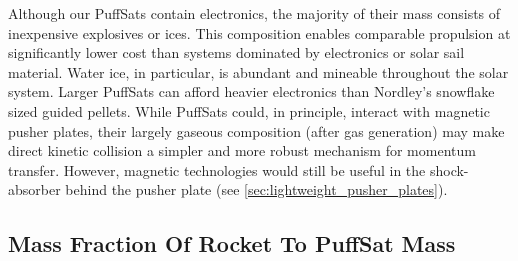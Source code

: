 \documentclass{article}
\begin{document}
Although our PuffSats contain electronics, the majority of their mass consists of inexpensive explosives or ices. This composition enables comparable propulsion at significantly lower cost than systems dominated by electronics or solar sail material. Water ice, in particular, is abundant and mineable throughout the solar system.  Larger PuffSats can afford heavier electronics than Nordley's snowflake sized guided pellets.  While PuffSats could, in principle, interact with magnetic pusher plates, their largely gaseous composition (after gas generation) may make direct kinetic collision a simpler and more robust mechanism for momentum transfer.  However, magnetic technologies would still be useful in the shock-absorber behind the pusher plate (see \autoref{sec:lightweight_pusher_plates}).

\subsection{Mass Fraction Of Rocket To PuffSat Mass}
\end{document}
